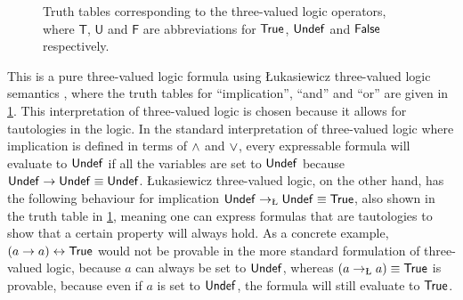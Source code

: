 {\begin{figure}
\begin{subfigure}{0.32\linewidth}
  \end{subfigure}
  \caption[Truth tables for three-valued logic operators.]{Truth tables corresponding to the three-valued logic operators, where $\mathsf{T}$, $\mathsf{U}$ and $\mathsf{F}$ are abbreviations for $\mathsf{True}$, $\mathsf{Undef}$ and $\mathsf{False}$ respectively.}%
  \label{fig:three-valued-truth-table}
\end{figure}%
%
This is a pure three-valued logic formula using \L{}ukasiewicz three-valued
logic semantics \cite{borowski70_swj}, where the truth tables for \enquote{implication}, \enquote{and} and \enquote{or} are given in \cref{fig:three-valued-truth-table}.  This
interpretation of three-valued logic is chosen because it allows for tautologies
in the logic.  In the standard interpretation of three-valued logic where
implication is defined in terms of $\mathbin{\mathsf \land}$ and $\mathbin{\mathsf \lor}$, every expressable
formula will evaluate to $\mathsf{Undef}$ if all the variables are set to
$\mathsf{Undef}$ because $\mathsf{Undef} \rightarrow \mathsf{Undef} \equiv \mathsf{Undef}$.
\L{}ukasiewicz three-valued logic, on the other hand, has the following
behaviour for implication $\predundef \predimp \predundef \equiv \predtrue$, also shown in the truth table in \cref{fig:three-valued-truth-table},
meaning one can express formulas that are tautologies to show that a certain property will always hold.
As a concrete example, $(a \rightarrow a) \leftrightarrow \mathsf{True}$ would not be provable in the more standard formulation of three-valued logic, because $a$ can always be set to $\mathsf{Undef}$, whereas $(a \predimp a) \equiv \predtrue$ is provable, because even if $a$ is set to $\mathsf{Undef}$, the formula will still evaluate to $\mathsf{True}$.

}
